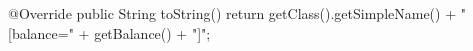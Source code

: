 \begin{unipdcode}[language=Java]
@Override
public String toString() {
    return getClass().getSimpleName()
        + "[balance=" + getBalance() + "]";
}
\end{unipdcode}
